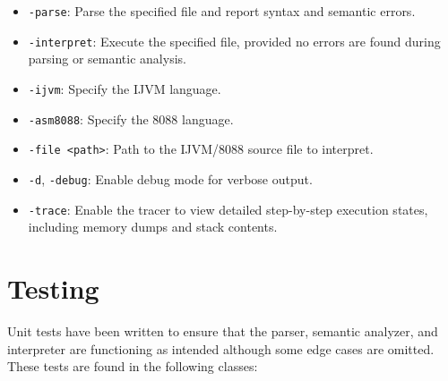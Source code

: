 \documentclass[11pt]{article}
\begin{document}
\begin{itemize}
    \item \texttt{-parse}: Parse the specified file and report syntax and semantic errors.
    \item \texttt{-interpret}: Execute the specified file, provided no errors are found during parsing or semantic analysis.
    \item \texttt{-ijvm}: Specify the IJVM language.
    \item \texttt{-asm8088}: Specify the 8088 language.
    \item \texttt{-file <path>}: Path to the IJVM/8088 source file to interpret.
    \item \texttt{-d}, \texttt{-debug}: Enable debug mode for verbose output.
    \item \texttt{-trace}: Enable the tracer to view detailed step-by-step execution states, including memory dumps and stack contents.
\end{itemize}

\section{Testing}
Unit tests have been written to ensure that the parser, semantic analyzer, and interpreter are functioning as intended although some edge cases are omitted. These tests are found in the following classes:
\end{document}
